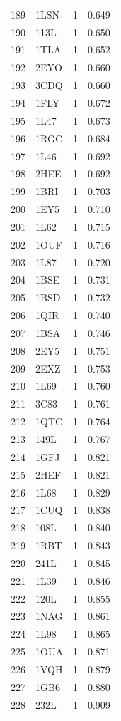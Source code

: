 \begin{longtable}{r l r r}
189 & 1LSN & 1 & 0.649 \\
190 & 113L & 1 & 0.650 \\
191 & 1TLA & 1 & 0.652 \\
192 & 2EYO & 1 & 0.660 \\
193 & 3CDQ & 1 & 0.660 \\
194 & 1FLY & 1 & 0.672 \\
195 & 1L47 & 1 & 0.673 \\
196 & 1RGC & 1 & 0.684 \\
197 & 1L46 & 1 & 0.692 \\
198 & 2HEE & 1 & 0.692 \\
199 & 1BRI & 1 & 0.703 \\
200 & 1EY5 & 1 & 0.710 \\
201 & 1L62 & 1 & 0.715 \\
202 & 1OUF & 1 & 0.716 \\
203 & 1L87 & 1 & 0.720 \\
204 & 1BSE & 1 & 0.731 \\
205 & 1BSD & 1 & 0.732 \\
206 & 1QIR & 1 & 0.740 \\
207 & 1BSA & 1 & 0.746 \\
208 & 2EY5 & 1 & 0.751 \\
209 & 2EXZ & 1 & 0.753 \\
210 & 1L69 & 1 & 0.760 \\
211 & 3C83 & 1 & 0.761 \\
212 & 1QTC & 1 & 0.764 \\
213 & 149L & 1 & 0.767 \\
214 & 1GFJ & 1 & 0.821 \\
215 & 2HEF & 1 & 0.821 \\
216 & 1L68 & 1 & 0.829 \\
217 & 1CUQ & 1 & 0.838 \\
218 & 108L & 1 & 0.840 \\
219 & 1RBT & 1 & 0.843 \\
220 & 241L & 1 & 0.845 \\
221 & 1L39 & 1 & 0.846 \\
222 & 120L & 1 & 0.855 \\
223 & 1NAG & 1 & 0.861 \\
224 & 1L98 & 1 & 0.865 \\
225 & 1OUA & 1 & 0.871 \\
226 & 1VQH & 1 & 0.879 \\
227 & 1GB6 & 1 & 0.880 \\
228 & 232L & 1 & 0.909 \\

\end{longtable}
